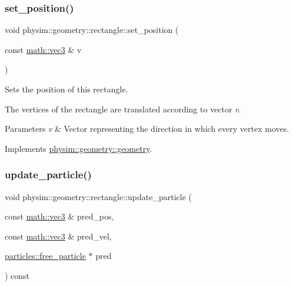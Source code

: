 \subsubsection{\texorpdfstring{set\+\_\+position()}{set\_position()}}
{\footnotesize\ttfamily void physim\+::geometry\+::rectangle\+::set\+\_\+position (\begin{DoxyParamCaption}\item[{const \hyperlink{structphysim_1_1math_1_1vec3}{math\+::vec3} \&}]{v }\end{DoxyParamCaption})\hspace{0.3cm}{\ttfamily [virtual]}}



Sets the position of this rectangle. 

The vertices of the rectangle are translated according to vector {\itshape v}. 
\begin{DoxyParams}{Parameters}
{\em v} & Vector representing the direction in which every vertex moves. \\
\hline
\end{DoxyParams}


Implements \hyperlink{classphysim_1_1geometry_1_1geometry_a45bffd27f5e8d59375762cf7987625e1}{physim\+::geometry\+::geometry}.

\mbox{\label{classphysim_1_1geometry_1_1rectangle_a86072bd1493b9136841aca97f33d2737}} 
\subsubsection{\texorpdfstring{update\+\_\+particle()}{update\_particle()}\hspace{0.1cm}{\footnotesize\ttfamily [1/2]}}
{\footnotesize\ttfamily void physim\+::geometry\+::rectangle\+::update\+\_\+particle (\begin{DoxyParamCaption}\item[{const \hyperlink{structphysim_1_1math_1_1vec3}{math\+::vec3} \&}]{pred\+\_\+pos,  }\item[{const \hyperlink{structphysim_1_1math_1_1vec3}{math\+::vec3} \&}]{pred\+\_\+vel,  }\item[{\hyperlink{classphysim_1_1particles_1_1free__particle}{particles\+::free\+\_\+particle} $\ast$}]{pred }\end{DoxyParamCaption}) const\hspace{0.3cm}{\ttfamily [virtual]}}




